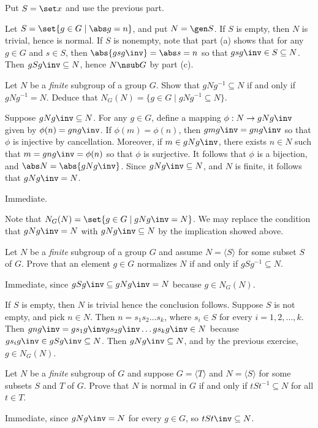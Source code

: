 \begin{problems}
\begin{solalph}
        \noindent \leftimp Put $S = \set x$ and use the previous part.
        \item Let $S = \set{g \in G \mid \abs g = n}$, and put $N = \gen S$. If $S$ is empty, then $N$ is trivial, hence is normal. If $S$ is nonempty, note that part (a) shows that for any $g \in G$ and $s \in S$, then $\abs{gsg\inv} = \abs s = n$ so that $gsg\inv \in S \subseteq N$. Then $gSg\inv \subseteq N$, hence $N \nsub G$ by part (c).
    \end{solalph}
    \item Let $N$ be a \textit{finite} subgroup of a group $G$. Show that $gNg^{-1} \subseteq N$ if and only if $gNg^{-1} = N$. Deduce that $N_G(N) = \{ g \in G \mid gNg^{-1} \subseteq N \}$.
    \begin{sol}
        \rightimp Suppose $gNg\inv \subseteq N$. For any $g \in G$, define a mapping $\phi : N \to gNg\inv$ given by $\phi(n) = gng\inv$. If $\phi(m) = \phi(n)$, then $gmg\inv = gng\inv$ so that $\phi$ is injective by cancellation. Moreover, if $m \in gNg\inv$, there exists $n \in N$ such that $m = gng\inv = \phi(n)$ so that $\phi$ is surjective. It follows that $\phi$ is a bijection, and $\abs N = \abs{gNg\inv}$. Since $gNg\inv \subseteq N$, and $N$ is finite, it follows that $gNg\inv = N$.

        \noindent \leftimp Immediate.

        Note that $N_G(N) = \set{g \in G \mid gNg\inv = N}$. We may replace the condition that $gNg\inv = N$ with $gNg\inv \subseteq N$ by the implication showed above.
    \end{sol}
    \item Let $N$ be a \textit{finite} subgroup of a group $G$ and assume $N = \langle S \rangle$ for some subset $S$ of $G$. Prove that an element $g \in G$ normalizes $N$ if and only if $gSg^{-1} \subseteq N$.
    \begin{sol}
        \rightimp Immediate, since $gSg\inv \subseteq gNg\inv = N$ because $g \in N_G(N)$.

        \noindent \leftimp If $S$ is empty, then $N$ is trivial hence the conclusion follows. Suppose $S$ is not empty, and pick $n \in N$. Then $n = s_1s_2 \dots s_k$, where $s_i \in S$ for every $i = 1, 2, \ldots, k$. Then $gng\inv = gs_1g\inv gs_2g\inv \ldots gs_kg\inv \in N$ because $gs_ig\inv \in gSg\inv \subseteq N$. Then $gNg\inv \subseteq N$, and by the previous exercise, $g \in N_G(N)$. 
    \end{sol}
    \item Let $N$ be a \textit{finite} subgroup of $G$ and suppose $G = \langle T \rangle$ and $N = \langle S \rangle$ for some subsets $S$ and $T$ of $G$. Prove that $N$ is normal in $G$ if and only if $tSt^{-1} \subseteq N$ for all $t \in T$.
    \begin{sol}
        \rightimp Immediate, since $gNg\inv = N$ for every $g \in G$, so $tSt\inv \subseteq N$.


\end{sol}
\end{problems}

